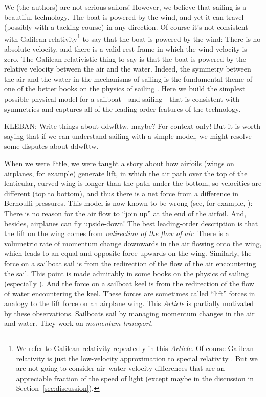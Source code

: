 \documentclass[letterpaper]{article}
\newcommand{\documentname}{\textsl{Article}}
\newcommand{\secref}[1]{Section~\ref{#1}}
\begin{document}
We (the authors) are not serious sailors!
However, we believe that sailing is a beautiful technology.
The boat is powered by the wind, and yet it can travel (possibly with a tacking course) in any direction.
Of course it's not consistent with Galilean relativity\footnote{We refer to Galilean relativity repeatedly in this \documentname.
Of course Galilean relativity is just the low-velocity approximation to special relativity \cite{sr}.
But we are not going to consider air--water velocity differences that are an appreciable fraction of the speed of light (except maybe in the discussion in \secref{sec:discussion}).} to say that the boat is powered by the wind:
There is no absolute velocity, and there is a valid rest frame in which the wind velocity is zero.
The Galilean-relativistic thing to say is that the boat is powered by the relative velocity between the air and the water.
Indeed, the symmetry between the air and the water in the mechanisms of sailing is the fundamental theme of one of the better books on the physics of sailing \cite{symmetry}.
Here we build the simplest possible physical model for a sailboat---and sailing---that is consistent with symmetries and captures all of the leading-order features of the technology.

KLEBAN: Write things about ddwfttw, maybe? For context only! But it is worth saying that if we can understand sailing with a simple model, we might resolve some disputes about ddwfttw.

When we were little, we were taught a story about how airfoils (wings on airplanes, for example) generate lift, in which the air path over the top of the lenticular, curved wing is longer than the path under the bottom, so velocities are different (top to bottom), and thus there is a net force from a difference in Bernoulli pressures.
This model is now known to be wrong (see, for example, \cite{lift}):
There is no reason for the air flow to ``join up'' at the end of the airfoil.
And, besides, airplanes can fly upside-down!
The best leading-order description is that the lift on the wing comes from \emph{redirection of the flow of air}.
There is a volumetric rate of momentum change downwards in the air flowing onto the wing, which leads to an equal-and-opposite force upwards on the wing.
Similarly, the force on a sailboat sail is from the redirection of the flow of the air encountering the sail.
This point is made admirably in some books on the physics of sailing (especially \cite{sails}).
And the force on a sailboat keel is from the redirection of the flow of water encountering the keel.
These forces are sometimes called ``lift'' forces in analogy to the lift force on an airplane wing.
This \documentname{} is partially motivated by these observations.
Sailboats sail by managing momentum changes in the air and water.
They work on \emph{momentum transport}.
\end{document}
